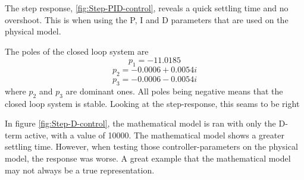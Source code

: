 The step response, \ref{fig:Step-PID-control}, reveals a quick settling time and no overshoot. This is when using the P, I and D parameters that are used on the physical model. 

The poles of the closed loop system are 
$$ p_1 = -11.0185 $$ 
$$ p_2 = -0.0006 + 0.0054i $$ 
$$ p_3 = -0.0006 - 0.0054i $$
where $p_2$ and $p_3$ are dominant ones. All poles being negative means that the closed loop system is stable. Looking at the step-response, this seams to be right 

In figure \ref{fig:Step-D-control}, the mathematical model is ran with only the D-term active, with a value of 10000. The mathematical model shows a greater settling time. However, when testing those controller-parameters on the physical model, the response was worse. A great example that the mathematical model may not always be a true representation.
